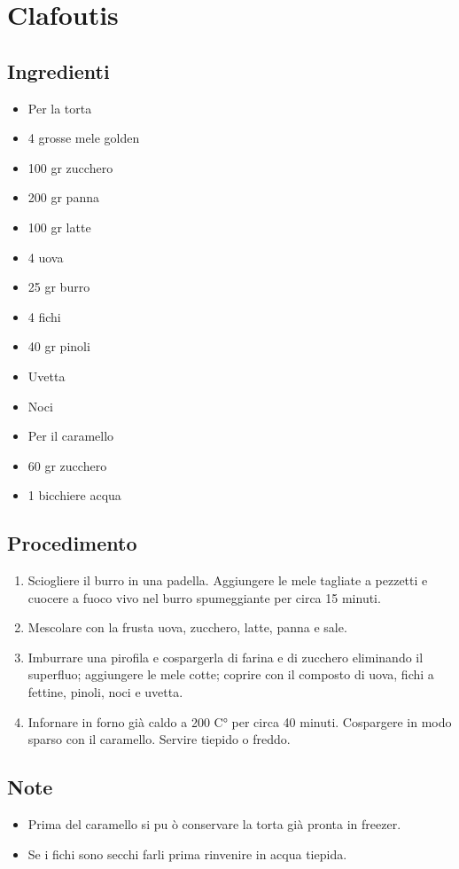 \section{Clafoutis}
\subsection{Ingredienti}
\begin{itemize}
\item Per la torta  
\item 4 grosse mele golden  
\item 100 gr zucchero  
\item 200 gr panna  
\item 100 gr latte  
\item 4 uova  
\item 25 gr burro  
\item 4 fichi  
\item 40 gr pinoli  
\item Uvetta  
\item Noci  
\item Per il caramello  
\item 60 gr zucchero  
\item 1 bicchiere acqua
\end{itemize}
\subsection{Procedimento}
\begin{enumerate}
\item  Sciogliere il burro in una padella. Aggiungere le mele tagliate a pezzetti e cuocere a fuoco vivo nel burro spumeggiante per circa 15 minuti.   
\item  Mescolare con la frusta uova, zucchero, latte, panna e sale.   
\item  Imburrare una pirofila e cospargerla di farina e di zucchero eliminando il superfluo; aggiungere le mele cotte; coprire con il composto di uova, fichi a fettine, pinoli, noci e uvetta.  
\item  Infornare in forno già caldo a 200 C° per circa 40 minuti. Cospargere in modo sparso con il caramello. Servire tiepido o freddo.
\end{enumerate}
\subsection{Note}
\begin{itemize}
\item Prima del caramello si pu ò conservare la torta già pronta in freezer.  
\item Se i fichi sono secchi farli prima rinvenire in acqua tiepida.
\end{itemize}
